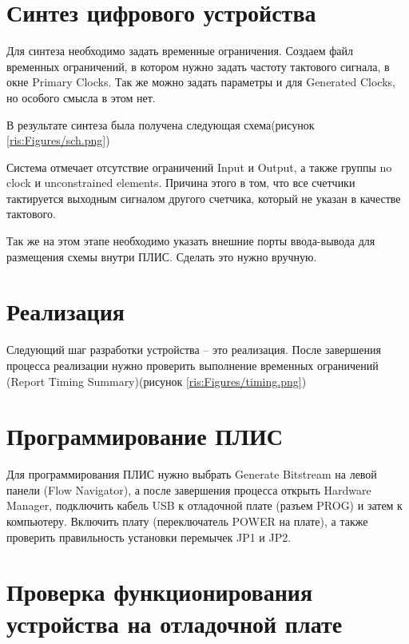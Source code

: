 \begin{sloppypar}
\section{Синтез цифрового устройства} %
Для синтеза необходимо задать временные ограничения. Создаем файл временных ограничений, в котором нужно задать частоту тактового сигнала, в окне Primary Clocks. Так же можно задать параметры и для Generated Clocks, но особого смысла в этом нет.

В результате синтеза была получена следующая схема(рисунок \ref{ris:Figures/sch.png})
\begin{landscape}
\end{landscape}

\newpage
Система отмечает отсутствие ограничений Input и Output, а также группы no clock и unconstrained elements. Причина этого в том, что все счетчики тактируется выходным сигналом другого счетчика, который не указан в качестве тактового.

Так же на этом этапе необходимо указать внешние порты ввода-вывода для размещения схемы внутри ПЛИС. Сделать это нужно вручную.



\section{Реализация} %
Следующий шаг разработки устройства – это реализация.
После завершения процесса реализации нужно проверить выполнение временных ограничений (Report Timing Summary)(рисунок \ref{ris:Figures/timing.png})
\section{Программирование ПЛИС} %

Для программирования ПЛИС нужно выбрать Generate Bitstream на левой панели (Flow Navigator), а после завершения процесса открыть Hardware Manager, подключить кабель USB к отладочной плате (разъем PROG) и затем к компьютеру. Включить плату (переключатель POWER на плате), а также проверить правильность установки перемычек JP1 и JP2. 


\section{Проверка функционирования устройства на отладочной плате} %


\end{sloppypar}
